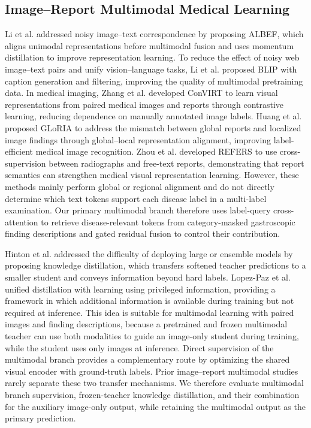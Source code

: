 \documentclass[Afour,sagev,times]{sagej}
\begin{document}
\subsection{Image--Report Multimodal Medical Learning}

Li et al. addressed noisy image--text correspondence by proposing ALBEF, which aligns unimodal representations before multimodal fusion and uses momentum distillation to improve representation learning.\cite{R19} To reduce the effect of noisy web image--text pairs and unify vision--language tasks, Li et al. proposed BLIP with caption generation and filtering, improving the quality of multimodal pretraining data.\cite{R20} In medical imaging, Zhang et al. developed ConVIRT to learn visual representations from paired medical images and reports through contrastive learning, reducing dependence on manually annotated image labels.\cite{R21} Huang et al. proposed GLoRIA to address the mismatch between global reports and localized image findings through global--local representation alignment, improving label-efficient medical image recognition.\cite{R22} Zhou et al. developed REFERS to use cross-supervision between radiographs and free-text reports, demonstrating that report semantics can strengthen medical visual representation learning.\cite{R23} However, these methods mainly perform global or regional alignment and do not directly determine which text tokens support each disease label in a multi-label examination. Our primary multimodal branch therefore uses label-query cross-attention to retrieve disease-relevant tokens from category-masked gastroscopic finding descriptions and gated residual fusion to control their contribution.

Hinton et al. addressed the difficulty of deploying large or ensemble models by proposing knowledge distillation, which transfers softened teacher predictions to a smaller student and conveys information beyond hard labels.\cite{R24} Lopez-Paz et al. unified distillation with learning using privileged information, providing a framework in which additional information is available during training but not required at inference.\cite{R25} This idea is suitable for multimodal learning with paired images and finding descriptions, because a pretrained and frozen multimodal teacher can use both modalities to guide an image-only student during training, while the student uses only images at inference. Direct supervision of the multimodal branch provides a complementary route by optimizing the shared visual encoder with ground-truth labels. Prior image--report multimodal studies rarely separate these two transfer mechanisms. We therefore evaluate multimodal branch supervision, frozen-teacher knowledge distillation, and their combination for the auxiliary image-only output, while retaining the multimodal output as the primary prediction.
\end{document}
